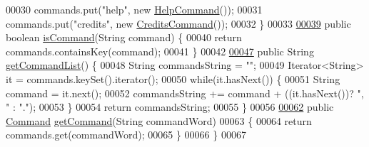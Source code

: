 \begin{DoxyCode}
00030         commands.put(\textcolor{stringliteral}{"help"}, \textcolor{keyword}{new} \hyperlink{classHelpCommand}{HelpCommand}());
00031         commands.put(\textcolor{stringliteral}{"credits"}, \textcolor{keyword}{new} \hyperlink{classCreditsCommand}{CreditsCommand}());
00032     \}
00033 
\hypertarget{CommandWords_8java_source_l00039}{}\hyperlink{classCommandWords_a646ed94a6d8d190b7cc445378ee2306e}{00039}     \textcolor{keyword}{public} \textcolor{keywordtype}{boolean} \hyperlink{classCommandWords_a646ed94a6d8d190b7cc445378ee2306e}{isCommand}(String command) \{
00040         \textcolor{keywordflow}{return} commands.containsKey(command);
00041     \}
00042 
\hypertarget{CommandWords_8java_source_l00047}{}\hyperlink{classCommandWords_aa26f54985e39543739e0ae291dcdb8f1}{00047}     \textcolor{keyword}{public} String \hyperlink{classCommandWords_aa26f54985e39543739e0ae291dcdb8f1}{getCommandList}() \{
00048         String commandsString = \textcolor{stringliteral}{""};
00049         Iterator<String> it = commands.keySet().iterator();
00050         \textcolor{keywordflow}{while}(it.hasNext()) \{
00051             String command = it.next();
00052             commandsString += command + ((it.hasNext())? \textcolor{stringliteral}{", "} : \textcolor{stringliteral}{"."});
00053         \}
00054         \textcolor{keywordflow}{return} commandsString;
00055     \}
00056 
\hypertarget{CommandWords_8java_source_l00062}{}\hyperlink{classCommandWords_af89bc564e4cf32021721ca44f46de6cb}{00062}     \textcolor{keyword}{public} \hyperlink{classCommand}{Command} \hyperlink{classCommandWords_af89bc564e4cf32021721ca44f46de6cb}{getCommand}(String commandWord)
00063     \{
00064         \textcolor{keywordflow}{return} commands.get(commandWord);
00065     \}
00066 \}
00067 
\end{DoxyCode}
